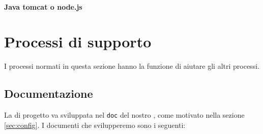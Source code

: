 	\paragraph{Java tomcat o node.js}




\section{Processi di supporto}
I processi normati in questa sezione hanno la funzione di aiutare gli altri processi.

\subsection{Documentazione}
La  di progetto va sviluppata nel  \texttt{doc} del nostro , come motivato nella sezione \ref{sec:config}. I documenti che svilupperemo sono i seguenti:
